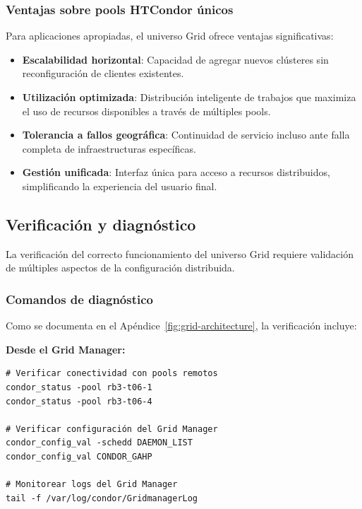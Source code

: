 \subsubsection{Ventajas sobre pools HTCondor únicos}
\noindent

Para aplicaciones apropiadas, el universo Grid ofrece ventajas significativas:

\begin{itemize}
	\item \textbf{Escalabilidad horizontal}: Capacidad de agregar nuevos clústeres sin reconfiguración de clientes existentes.

	\item \textbf{Utilización optimizada}: Distribución inteligente de trabajos que maximiza el uso de recursos disponibles a través de múltiples pools.

	\item \textbf{Tolerancia a fallos geográfica}: Continuidad de servicio incluso ante falla completa de infraestructuras específicas.

	\item \textbf{Gestión unificada}: Interfaz única para acceso a recursos distribuidos, simplificando la experiencia del usuario final.
\end{itemize}

\subsection{Verificación y diagnóstico}
\noindent

La verificación del correcto funcionamiento del universo Grid requiere validación de múltiples aspectos de la configuración distribuida.

\subsubsection{Comandos de diagnóstico}
\noindent

Como se documenta en el Apéndice~\ref{fig:grid-architecture}, la verificación incluye:

\textbf{Desde el Grid Manager:}

\begin{verbatim}
# Verificar conectividad con pools remotos
condor_status -pool rb3-t06-1
condor_status -pool rb3-t06-4

# Verificar configuración del Grid Manager
condor_config_val -schedd DAEMON_LIST
condor_config_val CONDOR_GAHP

# Monitorear logs del Grid Manager
tail -f /var/log/condor/GridmanagerLog
\end{verbatim}

